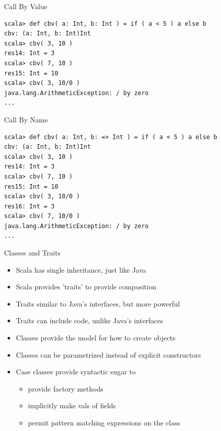 \documentclass[t]{beamer}
\begin{document}
\begin{frame}[fragile]{Call By Value}
  \begin{tiny}
  \begin{verbatim}
scala> def cbv( a: Int, b: Int ) = if ( a < 5 ) a else b
cbv: (a: Int, b: Int)Int
scala> cbv( 3, 10 )
res14: Int = 3
scala> cbv( 7, 10 )
res15: Int = 10
scala> cbv( 3, 10/0 )
java.lang.ArithmeticException: / by zero
...
  \end{verbatim}
  \end{tiny}
  \note{}
\end{frame}

\begin{frame}[fragile]{Call By Name}
  \begin{tiny}
  \begin{verbatim}
scala> def cbv( a: Int, b: => Int ) = if ( a < 5 ) a else b
cbv: (a: Int, b: Int)Int
scala> cbv( 3, 10 )
res14: Int = 3
scala> cbv( 7, 10 )
res15: Int = 10
scala> cbv( 3, 10/0 )
res16: Int = 3
scala> cbv( 7, 10/0 )
java.lang.ArithmeticException: / by zero
...
  \end{verbatim}
  \end{tiny}
  \note{}
\end{frame}

\begin{frame}{Classes and Traits}
  \begin{itemize}
    \item Scala has single inheritance, just like Java
    \item Scala provides 'traits' to provide composition
    \item Traits similar to Java's interfaces, but more powerful
    \item Traits can include code, unlike Java's interfaces
    \item Classes provide the model for how to create objects
    \item Classes can be parametrized instead of explicit constructors
    \item Case classes provide syntactic sugar to
      \begin{itemize}
      \item provide factory methods
      \item implicitly make vals of fields
      \item permit pattern matching expressions on the class
      \end{itemize}
  \end{itemize}
  \note{}
\end{frame}
\end{document}
